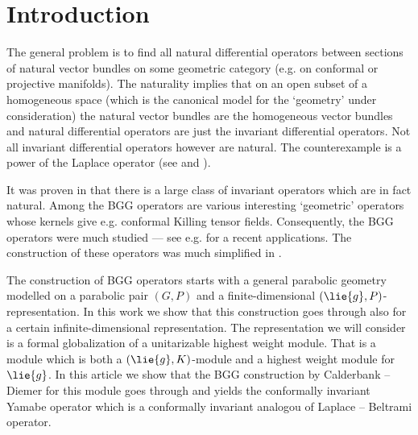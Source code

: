 \chapter*{Introduction}


The general problem is to find all natural differential operators  between sections of natural vector bundles on some geometric category (e.g. on conformal or projective manifolds). The naturality implies that on an open subset of a homogeneous space (which is the canonical model for the `geometry' under consideration) the natural vector bundles are the homogeneous vector bundles and natural differential operators are just the invariant differential operators. Not all invariant differential operators however are natural. The counterexample is a power of the Laplace operator (see \cite{graham_conformally_1992} and \cite{gover_conformally_2004}).

It was proven in \cite{cap_bernstein-gelfand-gelfand_2001} that there is a large class of invariant operators which are in fact natural.  Among the BGG operators are various interesting `geometric' operators whose kernels give e.g. conformal Killing tensor fields. Consequently, the BGG operators were much studied --- see e.g. \cite{cap_projective_2010} for a recent applications. The construction of these operators was much simplified in \cite{calderbank_differential_2001}.

The construction of BGG operators starts with a general parabolic geometry modelled on a parabolic pair $(G,P)$ and a finite-dimensional $(\lie{g},P)$-representation. In this work we show that this construction goes through also for a certain infinite-dimensional representation. The representation we will consider is a formal globalization of a unitarizable highest weight module. That is a module which is both a $(\lie{g},K)$-module and a highest weight module for $\lie{g}$. In this article we show that the BGG construction by Calderbank -- Diemer for this module goes through and  yields the conformally invariant Yamabe operator which is a conformally invariant analogou of Laplace -- Beltrami operator.